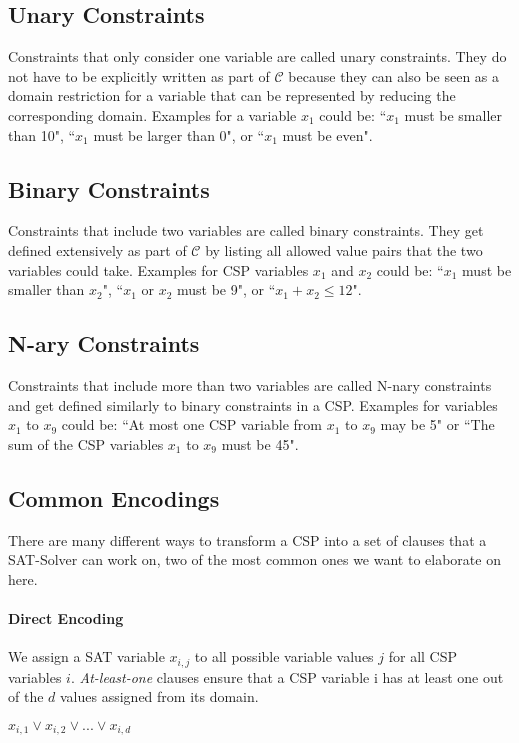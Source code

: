 \subsection{Unary Constraints}
Constraints that only consider one variable are called unary constraints. They do not have to be explicitly written as part of $\mathcal{C}$ because they can also be seen as a domain restriction for a variable that can be represented by reducing the corresponding domain. Examples for a variable $x_1$ could be: ``$x_1$ must be smaller than 10", ``$x_1$ must be larger than 0", or ``$x_1$ must be even".

\subsection{Binary Constraints}
Constraints that include two variables are called binary constraints. They get defined extensively as part of $\mathcal{C}$ by listing all allowed value pairs that the two variables could take. Examples for CSP variables $x_1$ and $x_2$ could be: ``$x_1$ must be smaller than $x_2$", ``$x_1$ or $x_2$ must be 9", or ``$x_1 + x_2 \leq 12$".

\subsection{N-ary Constraints}
Constraints that include more than two variables are called N-nary constraints and get defined similarly to binary constraints in a CSP. Examples for variables $x_1$ to $x_9$ could be: ``At most one CSP variable from $x_1$ to $x_9$ may be 5" or ``The sum of the CSP variables $x_1$ to $x_9$ must be 45".

\subsection{Common Encodings}
There are many different ways to transform a CSP into a set of clauses that a SAT-Solver can work on, two of the most common ones we want to elaborate on here.

\paragraph{Direct Encoding \cite{walsh2000SATvCSP}\cite{gent20002ArcConsistencyInSAT}}
We assign a SAT variable $x_{i,j}$ to all possible variable values $j$ for all CSP variables $i$. \emph{At-least-one} clauses ensure that a CSP variable i has at least one out of the $d$ values assigned from its domain.
\begin{center}
    $x_{i,1} \lor x_{i,2} \lor ... \lor x_{i,d}$
\end{center}

